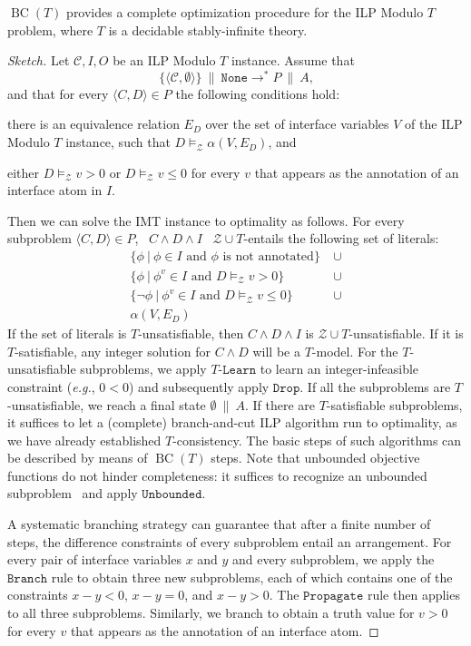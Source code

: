 \documentclass{llncs}
\newcommand{\eg}[0]{\emph{e.g.}, }
\newcommand\none[0]{\ensuremath{\mathtt{None}}}
\newcommand{\tr}[1]{\ensuremath{\mathtt{#1}}}
\newcommand{\ttr}[1]{\ensuremath{T\text{-}\mathtt{#1}}}
\newcommand{\state}[2]{\ensuremath{#1\ \|\ #2}}
\newcommand{\statenone}[1]{\state{#1}{\none}}
\newcommand{\subp}[2]{\ensuremath{\langle#1, #2\rangle}}
\newcommand{\Z}[0]{\ensuremath{\mathcal{Z}}}
\newcommand{\ZT}[0]{\ensuremath{\mathcal{Z} \cup T}}
\newcommand{\modelsz}[0]{\ensuremath{ \models_{\Z} }}
\newcommand{\set}[2]{\ensuremath{\{#1\ |\ #2\}}}
\newcommand{\setsp}[2]{\ensuremath{\{ \subp{#1}{#2} \}}}
\newcommand{\transstar}[0]{\ensuremath{ \longrightarrow^{*} }}
\newcommand{\cd}{\subp{C}{D}}
\newcommand{\pa}{\state{P}{A}}
\newcommand{\bct}[0]{\ensuremath{\operatorname{BC}(T)}}
\begin{document}
\begin{theorem}[Completeness]
  \label{thm:complete}
  \bct{} provides a complete optimization procedure for the ILP Modulo
  $T$ problem, where $T$ is a decidable stably-infinite theory.
\end{theorem}
\begin{proof}[Sketch]
  Let $\mathcal{C}, I, O$ be an ILP Modulo $T$ instance. Assume that
  $$\statenone{\setsp{\mathcal{C}}{\emptyset}} \transstar \pa\text{,}$$
  and that for every $\cd \in P$ the following conditions hold:
  \begin{inparaenum}[(a)]
  \item there is an equivalence relation $E_D$ over the set of
    interface variables $V$ of the ILP Modulo $T$ instance, such that
    $D \modelsz \alpha(V, E_D)$, and
  \item either $D \modelsz v > 0$ or $D \modelsz v \leq 0$ for every
    $v$ that appears as the annotation of an interface atom in $I$.
  \end{inparaenum}
  Then we can solve the IMT instance to optimality as follows. For
  every subproblem $\cd \in P$, ~$C \wedge D \wedge I$~ \ZT{}-entails
  the following set of literals:
  \begin{align*}
    \set{\phi}{\phi \in I \text{ and } \phi \text{ is not annotated}}
    &\ \cup \\
    \set{\phi}{\phi^v \in I \text{ and } D \modelsz v > 0}
    &\ \cup \\
    \set{\neg \phi}{\phi^v \in I \text{ and } D \modelsz v \leq 0}
    &\ \cup \\
    \alpha(V, E_D)
  \end{align*}
  If the set of literals is $T$-unsatisfiable, then $C \wedge D \wedge
  I$ is \ZT{}-unsatisfiable. If it is $T$-satisfiable, any integer
  solution for $C \wedge D$ will be a $T$-model. For the
  $T$-unsatisfiable subproblems, we apply \ttr{Learn} to learn an
  integer-infeasible constraint (\eg $0 < 0$) and subsequently apply
  \tr{Drop}. If all the subproblems are $T$-unsatisfiable, we reach a
  final state \state{\emptyset}{A}. If there are $T$-satisfiable
  subproblems, it suffices to let a (complete) branch-and-cut ILP
  algorithm run to optimality, as we have already established
  $T$-consistency. The basic steps of such algorithms can be described
  by means of \bct{} steps. Note that unbounded objective functions do
  not hinder completeness: it suffices to recognize an unbounded
  subproblem~\cite{unboundedip} and apply \tr{Unbounded}.

  A systematic branching strategy can guarantee that after a finite
  number of steps, the difference constraints of every subproblem
  entail an arrangement. For every pair of interface variables $x$ and
  $y$ and every subproblem, we apply the \tr{Branch} rule to obtain
  three new subproblems, each of which contains one of the constraints
  $x - y < 0$, $x - y = 0$, and $x - y > 0$. The \tr{Propagate} rule
  then applies to all three subproblems. Similarly, we branch to
  obtain a truth value for $v > 0$ for every $v$ that appears as the
  annotation of an interface atom.
\end{proof}
\end{document}
